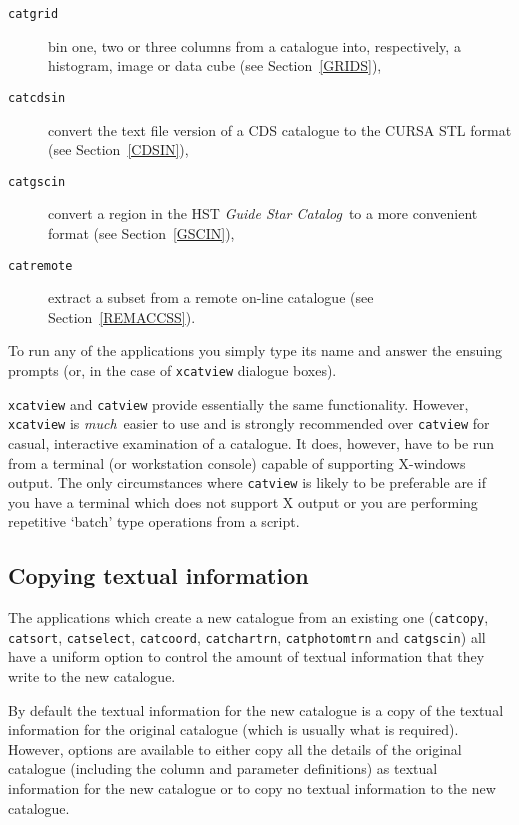 \documentclass[twoside,11pt]{starlink}
\begin{document}
\begin{description}
  \item[ \texttt{catgrid} ] bin one, two or three columns from a catalogue
   into, respectively, a histogram, image or data cube
   (see Section~\ref{GRIDS}),

  \item[ \texttt{catcdsin} ] convert the text file version of a CDS
   catalogue to the CURSA STL format (see Section~\ref{CDSIN}),

  \item[ \texttt{catgscin} ] convert a region in the HST \textit{Guide Star
   Catalog}\, to a more convenient format (see Section~\ref{GSCIN}),

  \item[ \texttt{catremote} ] extract a subset from a remote on-line
   catalogue (see Section~\ref{REMACCSS}).

\end{description}

To run any of the applications you simply type its name and answer the
ensuing prompts (or, in the case of \texttt{xcatview} dialogue boxes).

\texttt{xcatview} and \texttt{catview} provide essentially the same
functionality. However, \texttt{xcatview} is \textit{much}\, easier to use
and is strongly recommended over \texttt{catview} for casual,
interactive examination of a catalogue. It does, however, have to be
run from a terminal (or workstation console) capable of supporting
X-windows output. The only circumstances where \texttt{catview} is likely
to be preferable are if you have a terminal which does not support X
output or you are performing repetitive `batch' type operations from a
script.

\subsection{\label{COPYTEXT}Copying textual information}

The applications which create a new catalogue from an existing one
(\texttt{catcopy}, \texttt{catsort},
\newline \texttt{catselect}, \texttt{catcoord}, \texttt{catchartrn},
\texttt{catphotomtrn} and \texttt{catgscin}) all have a uniform option to
control the amount of textual information that they write to the new
catalogue.

By default the textual information for the new catalogue is a copy of
the textual information for the original catalogue (which is usually
what is required).  However, options are available to either copy all
the details of the original catalogue (including the column and
parameter definitions) as textual information for the new catalogue or
to copy no textual information to the new catalogue.
\end{document}

